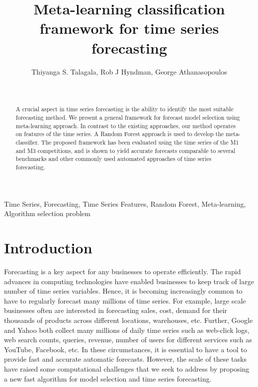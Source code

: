 \documentclass[11pt,]{article}
\title{Meta-learning classification framework for time series forecasting}
\author{Thiyanga S. Talagala, Rob J Hyndman, George Athanasopoulos}
\date{\sf\Date~\Month~\Year}
\theoremstyle{definition}
\theoremstyle{definition}
\theoremstyle{definition}
\theoremstyle{remark}
\begin{document}
\maketitle

\begin{abstract}
A crucial aspect in time series forecasting is the ability to identify the most suitable forecasting method. We present a general framework for forecast model selection using meta-learning approach. In contrast to the existing approaches, our method operates on features of the time series. A Random Forest approach is used to develop the meta-classifier. The proposed framework has been evaluated using the time series of the M1 and M3 competitions, and is shown to yield accurate forecasts comparable to several benchmarks and other commonly used automated approaches of time series forecasting.
\end{abstract}

\begin{keywords}
Time Series, Forecasting, Time Series Features, Random Forest, Meta-learning, Algorithm selection problem

\end{keywords}

\newpage

\section{Introduction}\label{introduction}

Forecasting is a key aspect for any businesses to operate efficiently.
The rapid advances in computing technologies have enabled businesses to
keep track of large number of time series variables. Hence, it is
becoming increasingly common to have to regularly forecast many millions
of time series. For example, large scale businesses often are interested
in forecasting sales, cost, demand for their thousands of products
across different locations, warehouses, etc. Further, Google and Yahoo
both collect many millions of daily time series such as web-click logs,
web search counts, queries, revenue, number of users for different
services such as YouTube, Facebook, etc. In these circumstances, it is
essential to have a tool to provide fast and accurate automatic
forecasts. However, the scale of these tasks have raised some
computational challenges that we seek to address by proposing a new fast
algorithm for model selection and time series forecasting.
\end{document}

